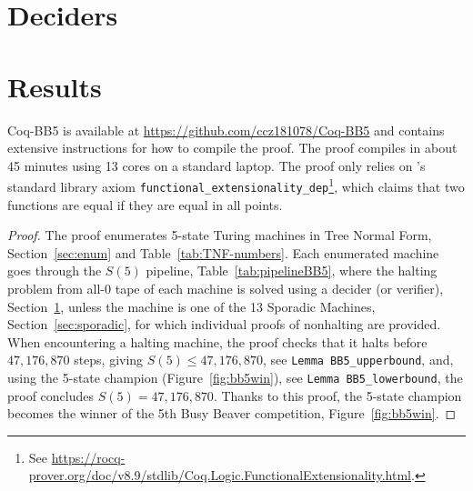 \documentclass[a4paper,british]{article}
\theoremstyle{definition} %
\numberwithin{equation}{section}
\theoremstyle{definition} %
\newcommand{\numSporadic}{13\xspace}
\newcommand{\CoqBB}{Coq-BB5\xspace}
\begin{document}


\newpage



\section{Deciders}\label{sec:deciders}







% 

\newpage




\newpage


\newpage
\section{Results}\label{sec:results}

\CoqBB is available at \url{https://github.com/ccz181078/Coq-BB5} and contains extensive instructions for how to compile the proof. The proof compiles in about 45 minutes using 13 cores on a standard laptop. The proof only relies on \Coq's standard library axiom \texttt{functional\_extensionality\_dep}\footnote{See \url{https://rocq-prover.org/doc/v8.9/stdlib/Coq.Logic.FunctionalExtensionality.html}.}, which claims that two functions are equal if they are equal in all points.

\thBBTheFifth*
\begin{proof}
    The \Coq proof enumerates 5-state Turing machines in Tree Normal Form, Section~\ref{sec:enum} and Table~\ref{tab:TNF-numbers}. Each enumerated machine goes through the $S(5)$ pipeline, Table~\ref{tab:pipelineBB5}, where the halting problem from all-0 tape of each machine is solved using a decider (or verifier), Section~\ref{sec:deciders}, unless the machine is one of the \numSporadic Sporadic Machines, Section~\ref{sec:sporadic}, for which individual \Coq proofs of nonhalting are provided.
    When encountering a halting machine, the proof checks that it halts before $47{,}176{,}870$ steps, giving $S(5) \leq 47{,}176{,}870$, see \texttt{Lemma BB5\_upperbound}, and, using the 5-state champion (Figure~\ref{fig:bb5win}), see \texttt{Lemma BB5\_lowerbound}, the proof concludes $S(5) = 47{,}176{,}870$. Thanks to this proof, the 5-state champion becomes the winner of the 5th Busy Beaver competition, Figure~\ref{fig:bb5win}.
\end{proof}
\end{document}
